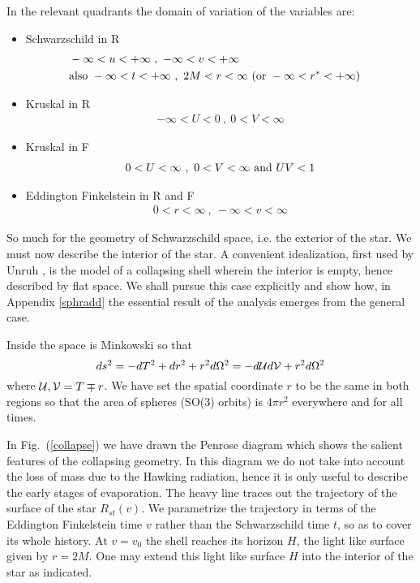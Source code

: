 \documentclass[12pt,oneside]{report}
\begin{document}
In the relevant quadrants the domain of variation of the variables are:
\begin{itemize}
\item Schwarzschild in R
\begin {eqnarray}
&- \infty  < u<  + \infty  \  , \ - \infty  <  v <   + \infty 
&\nonumber\\
&\hbox{also } 
-\infty < t < + \infty \ ,  \  2M < r < \infty \ 
( \hbox{or } - \infty < r^* < + \infty )&
\label{1.9}
\end {eqnarray}
\item Kruskal in R
\begin {eqnarray}
-\infty < U <  0 \  , \ 
0  < V <  \infty \label {1.10}
\end {eqnarray}
\item Kruskal in F
\begin {eqnarray}
0 < U <  \infty \  , \ 
0  < V <  \infty  \  \hbox{and} \  UV < 1 \label {1.11}
\end {eqnarray}
\item{  Eddington Finkelstein in R and F}
\begin {eqnarray}
0 < r <  \infty \  , \ 
-\infty  < v <  \infty \label {1.12}
\end {eqnarray}
\end{itemize}

So much for the geometry of Schwarzschild space, i.e. the exterior of
the star. We must now describe the interior of the star. A
convenient idealization, first used by Unruh \cite{Unru1}, is the model of a
collapsing shell wherein the interior is empty, hence described by
flat space. We shall pursue this case explicitly and show how, in
Appendix \ref{sphradd} the essential result of the analysis emerges from the
general case.

Inside the space is Minkowski so that
\begin{equation}
ds^2 =-dT^2 + dr^2 + r^2 d\Omega^2 =-d {\cal{U}}  d {\cal{V}}  + r^2 d\Omega^2
\label{E.1}
\end{equation}
where $ {\cal{U}}  , {\cal{V}}  = T \mp r$.
We have set
the spatial coordinate $r$ to be the same in both regions so 
that the area of spheres
(SO(3)  orbits) is $4 \pi r^2$ everywhere and for all times.

In Fig.~(\ref{collapse}) we have drawn
 the Penrose diagram which shows the salient
features of the collapsing geometry. 
In this diagram we do not take into
account the loss of mass due to the Hawking radiation, hence it is only
useful to describe the early stages of evaporation. The heavy line
traces out the trajectory of the surface of the star $R_{st}(v)$. We
parametrize the trajectory in terms of the  
Eddington Finkelstein time $v$ rather than
the Schwarzschild time $t$, so as to cover its whole history. At 
$v= v_0$ the shell reaches its horizon 
$H$, the light like
surface given by $r=2M$. One may extend this light 
like surface $H$ into the
interior of the star as indicated. 
\end{document}
